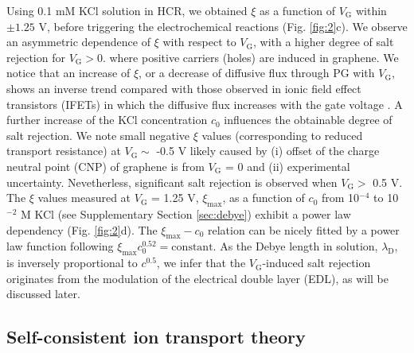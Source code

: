 \documentclass[journal=langd5,email=true, hyperref=true, keywords=false]{achemso}
\begin{document}
Using 0.1 mM KCl solution in HCR, we obtained $\xi$ as a function of
$V_{\mathrm{G}}$ within $\pm1.25$ V, before triggering the
electrochemical reactions (Fig. \ref{fig:2}c). We observe an
asymmetric dependence of $\xi$ with respect to $V_{\mathrm{G}}$, with
a higher degree of salt rejection for $V_{\mathrm{G}}>0$. where
positive carriers (holes) are induced in graphene. We notice that an
increase of $\xi$, or a decrease of diffusive flux through PG with
$V_{\mathrm{G}}$, shows an inverse trend compared with those
observed in ionic field effect transistors (IFETs) in which the
diffusive flux increases with the gate voltage
\cite{Nam_2009,Cheng_2018}. A further increase of the KCl
concentration $c_{0}$ influences the obtainable degree of salt
rejection. 
We note small negative $\xi$ values (corresponding to reduced transport resistance) at $V_{\mathrm{G}} \sim{}$ -0.5 V
likely caused by (i) offset of the charge neutral point (CNP) of graphene is from $V_{\mathrm{G}}$ = 0 and (ii) experimental uncertainty.
Nevetherless, significant salt rejection is observed when $V_{\mathrm{G}}>$ 0.5 V.
The $\xi$ values measured at $V_{\mathrm{G}}$ = 1.25 V,
$\xi_{\mathrm{max}}$, as a function of $c_{0}$ from 10$^{-4}$ to
10$^{-2}$ M KCl (see Supplementary Section \ref{sec:debye}) exhibit
a power law dependency (Fig. \ref{fig:2}d). The
$\xi_{\mathrm{max}}-c_{0}$ relation can be nicely fitted by a power
law function following
$\xi_{\mathrm{max}} c_{0}^{0.52} = \mathrm{constant}$. As the Debye
length in solution, $\lambda_{\mathrm{D}}$, is inversely proportional
to $c^{0.5}$, we infer that the $V_{\mathrm{G}}$-induced salt
rejection originates from the modulation of the electrical double
layer (EDL), as will be discussed later.

\subsection*{Self-consistent ion transport theory}
\label{sec:theory}
\end{document}
